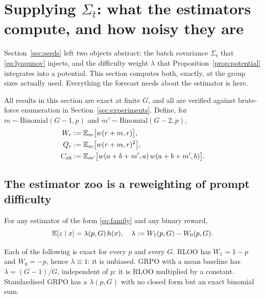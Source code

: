 \section{Supplying $\Sigma_t$: what the estimators compute, and how noisy they are}
\label{sec:theory}

Section~\ref{sec:seeds} left two objects abstract: the batch covariance $\Sigma_t$ that
\eqref{eq:lyapunov} injects, and the difficulty weight $\lambda$ that
Proposition~\ref{prop:potential} integrates into a potential. This section computes both, exactly,
at the group sizes actually used. Everything the forecast needs about the estimator is here.

All results in this section are exact at finite $G$, and all are verified against brute-force
enumeration in Section~\ref{sec:experiments}. Define, for $m \sim \mathrm{Binomial}(G-1, p)$ and
$m' \sim \mathrm{Binomial}(G-2, p)$,
\begin{align}
  \label{eq:contractions}
    W_r &:= \mathbb{E}_m\big[w(r + m, r)\big], \notag \\
  Q_r &:= \mathbb{E}_m\big[w(r + m, r)^2\big], \notag \\
  C_{ab} &:= \mathbb{E}_{m'}\big[w(a + b + m', a)\, w(a + b + m', b)\big].
\end{align}

\subsection{The estimator zoo is a reweighting of prompt difficulty}

\begin{proposition}
  \label{prop:mean}
  For any estimator of the form \eqref{eq:family} and any binary reward,
    \begin{equation}
    \mathbb{E}[z \mid x] = \lambda(p, G)\, h(x), \quad \lambda := W_1(p,G) - W_0(p,G).
  \end{equation}
\end{proposition}


Each of the following is exact for every $p$ and every $G$.
RLOO has $W_1 = 1-p$ and $W_0 = -p$, hence $\lambda \equiv 1$: it is unbiased.
GRPO with a mean baseline has $\lambda = (G-1)/G$, independent of $p$: it is RLOO multiplied by a
constant. Standardised GRPO has a $\lambda(p, G)$ with no closed form but an exact binomial sum.

